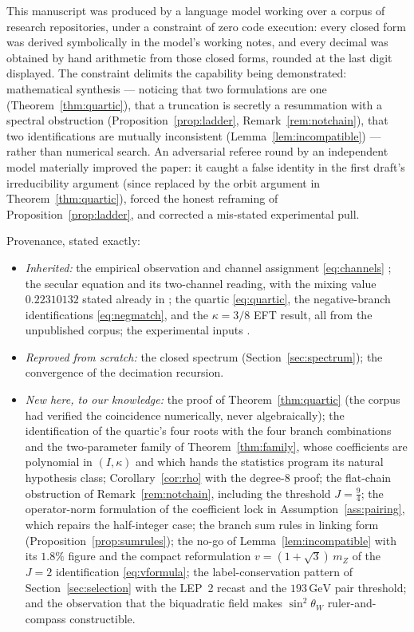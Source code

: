 \documentclass[11pt,a4paper]{article}
\theoremstyle{definition}
\newcommand{\GeV}{\,\mathrm{GeV}}
\newcommand{\swsq}{\sin^2\theta_W}
\begin{document}
This manuscript was produced by a language model working over a corpus of
research repositories, under a constraint of zero code execution: every
closed form was derived symbolically in the model's working notes, and
every decimal was obtained by hand arithmetic from those closed forms,
rounded at the last digit displayed. The constraint delimits the capability
being demonstrated: mathematical synthesis --- noticing that two
formulations are one (Theorem~\ref{thm:quartic}), that a truncation is
secretly a resummation with a spectral obstruction
(Proposition~\ref{prop:ladder}, Remark~\ref{rem:notchain}), that two
identifications are mutually inconsistent (Lemma~\ref{lem:incompatible})
--- rather than numerical search. An adversarial referee round by an
independent model materially improved the paper: it caught a false identity
in the first draft's irreducibility argument (since replaced by the orbit
argument in Theorem~\ref{thm:quartic}), forced the honest reframing of
Proposition~\ref{prop:ladder}, and corrected a mis-stated experimental
pull.

Provenance, stated exactly:
\begin{itemize}
\item \emph{Inherited:} the empirical observation and channel assignment
\eqref{eq:channels} \cite{devries2004,devriesrivero2005,rivero2006}; the
secular equation and its two-channel reading, with the mixing value
$0.22310132$ stated already in \cite{rivero2006}; the quartic
\eqref{eq:quartic}, the negative-branch identifications
\eqref{eq:negmatch}, and the $\kappa=3/8$ EFT result, all from the
unpublished corpus; the experimental inputs \cite{pdg2024,cmsw2024,cdf2022}.
\item \emph{Reproved from scratch:} the closed spectrum
(Section~\ref{sec:spectrum}); the convergence of the decimation recursion.
\item \emph{New here, to our knowledge:} the proof of
Theorem~\ref{thm:quartic} (the corpus had verified the coincidence
numerically, never algebraically); the identification of the quartic's
four roots with the four branch combinations and the two-parameter family
of Theorem~\ref{thm:family}, whose coefficients are polynomial in
$(I,\kappa)$ and which hands the statistics program its natural
hypothesis class; Corollary~\ref{cor:rho} with the degree-$8$ proof; the
flat-chain obstruction of Remark~\ref{rem:notchain}, including the
threshold $J=\tfrac94$; the operator-norm formulation of the coefficient
lock in Assumption~\ref{ass:pairing}, which repairs the half-integer case;
the branch sum rules in linking form (Proposition~\ref{prop:sumrules});
the no-go of Lemma~\ref{lem:incompatible} with its $1.8\%$ figure and the
compact reformulation $v=(1+\sqrt3)\,m_Z$ of the $J{=}2$ identification
\eqref{eq:vformula}; the label-conservation pattern of
Section~\ref{sec:selection} with the LEP~2 recast and the $193\GeV$ pair
threshold; and the observation that the biquadratic field makes $\swsq$
ruler-and-compass constructible.
\end{itemize}
\end{document}
